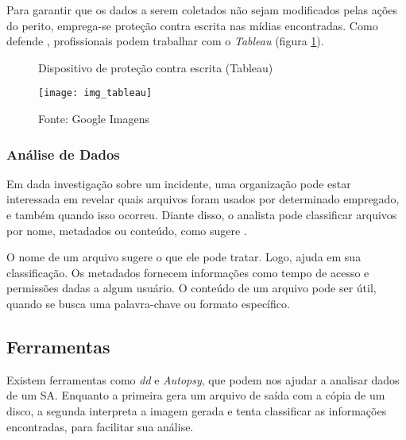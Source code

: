     \vspace{4mm}
    
    \hspace{1cm}
    Para garantir que os dados a serem coletados  não sejam modificados pelas ações do perito, emprega-se proteção contra escrita nas mídias encontradas. Como defende , profissionais podem trabalhar com o \textit{Tableau} (figura \ref{tableau_img}).
    
    \begin{figure}[H]
    	\centering
    	\caption{Dispositivo de proteção contra escrita (Tableau)}
    	\texttt{[image: img\_tableau]}
    	\caption*{Fonte: Google Imagens}
    	\label{tableau_img}
    \end{figure}
    
    \subsubsection{Análise de Dados}
    
    \hspace{1cm}
    Em dada investigação sobre um incidente, uma organização pode estar interessada em revelar quais arquivos foram usados por determinado empregado, e também quando isso ocorreu. Diante disso, o analista pode classificar arquivos por nome, metadados ou conteúdo, como sugere .
    
    \vspace{4mm}
    
    \hspace{1cm}
    O nome de um arquivo sugere o que ele pode tratar. Logo, ajuda em sua classificação. Os metadados fornecem informações como tempo de acesso e permissões dadas a algum usuário. O conteúdo de um arquivo pode ser útil, quando se busca uma palavra-chave ou formato específico.
    
    \subsection{Ferramentas} \label{cap2_ferramentas}
    
    \hspace{1cm}
    Existem ferramentas como \textit{dd} e \textit{Autopsy}, que podem nos ajudar a analisar dados de um SA. Enquanto a primeira gera um arquivo de saída com a cópia de um disco, a segunda interpreta a imagem gerada e tenta classificar as informações encontradas, para facilitar sua análise.
    
